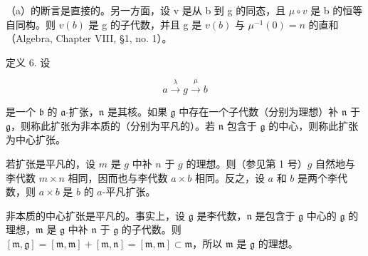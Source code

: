 （a）的断言是直接的。另一方面，设 v 是从 b 到 g 的同态，且 \(\mu \circ v\) 是 b 的恒等自同构。则 \(v(b)\) 是 g 的子代数，并且 g 是 \(v(b)\) 与 \(\mu^{-1}(0) = n\) 的直和（Algebra, Chapter VIII, §1, no. 1）。

定义 6. 设

\[
a \xrightarrow {\lambda} g \xrightarrow {\mu} b
\]

是一个 \(\mathfrak{b}\) 的 \(\mathfrak{a}\)-扩张，\(\mathfrak{n}\) 是其核。如果 \(\mathfrak{g}\) 中存在一个子代数（分别为理想）补 \(\mathfrak{n}\) 于 \(\mathfrak{g}\)，则称此扩张为非本质的（分别为平凡的）。若 \(\mathfrak{n}\) 包含于 \(\mathfrak{g}\) 的中心，则称此扩张为中心扩张。

若扩张是平凡的，设 \(m\) 是 \(g\) 中补 \(n\) 于 \(g\) 的理想。则（参见第 1 号）\(g\) 自然地与李代数 \(m \times n\) 相同，因而也与李代数 \(a \times b\) 相同。反之，设 \(a\) 和 \(b\) 是两个李代数，则 \(a \times b\) 是 \(b\) 的 \(a\)-平凡扩张。

非本质的中心扩张是平凡的。事实上，设 \(\mathfrak{g}\) 是李代数，\(\mathfrak{n}\) 是包含于 \(\mathfrak{g}\) 中心的 \(\mathfrak{g}\) 的理想，\(\mathfrak{m}\) 是 \(\mathfrak{g}\) 中补 \(\mathfrak{n}\) 于 \(\mathfrak{g}\) 的子代数。则 \([\mathfrak{m},\mathfrak{g}] = [\mathfrak{m},\mathfrak{m}] + [\mathfrak{m},\mathfrak{n}] = [\mathfrak{m},\mathfrak{m}] \subset \mathfrak{m}\)，所以 \(\mathfrak{m}\) 是 \(\mathfrak{g}\) 的理想。

